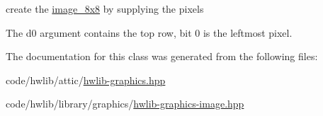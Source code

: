 create the \hyperlink{classhwlib_1_1image__8x8}{image\+\_\+8x8} by supplying the pixels

The d0 argument contains the top row, bit 0 is the leftmost pixel. 

The documentation for this class was generated from the following files\+:\begin{DoxyCompactItemize}
\item 
code/hwlib/attic/\hyperlink{hwlib-graphics_8hpp}{hwlib-\/graphics.\+hpp}\item 
code/hwlib/library/graphics/\hyperlink{hwlib-graphics-image_8hpp}{hwlib-\/graphics-\/image.\+hpp}\end{DoxyCompactItemize}
